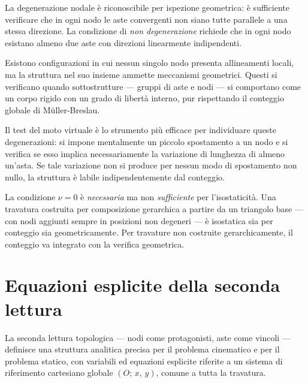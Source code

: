 La degenerazione nodale è riconoscibile per ispezione
geometrica: è sufficiente verificare che in ogni
nodo le aste convergenti non siano tutte parallele
a una stessa direzione. La condizione di
\emph{non degenerazione} richiede che in ogni nodo
esistano almeno due aste con direzioni linearmente
indipendenti.

Esistono configurazioni in cui nessun singolo nodo
presenta allineamenti locali, ma la struttura nel
suo insieme ammette meccanismi geometrici. Questi
si verificano quando sottostrutture --- gruppi di
aste e nodi --- si comportano come un corpo rigido
con un grado di libertà interno, pur rispettando
il conteggio globale di M\"{u}ller-Breslau.

Il test del moto virtuale è lo strumento più
efficace per individuare queste degenerazioni:
si impone mentalmente un piccolo spostamento a
un nodo e si verifica se esso implica
necessariamente la variazione di lunghezza di
almeno un'asta. Se tale variazione non si produce
per nessun modo di spostamento non nullo,
la struttura è labile indipendentemente dal
conteggio.

\begin{oss}
	La condizione $\nu = 0$ è \emph{necessaria}
	ma non \emph{sufficiente} per l'isostaticità.
	Una travatura costruita per composizione
	gerarchica a partire da un triangolo base ---
	con nodi aggiunti sempre in posizioni non
	degeneri --- è isostatica sia per conteggio
	sia geometricamente. Per travature non costruite
	gerarchicamente, il conteggio va integrato con
	la verifica geometrica.
\end{oss}


\section{Equazioni esplicite della seconda lettura}
\label{sec:equazioni_seconda_lettura}



La seconda lettura topologica --- nodi come protagonisti,
aste come vincoli --- definisce una struttura analitica
precisa per il problema cinematico e per il problema
statico, con variabili ed equazioni esplicite riferite
a un sistema di riferimento cartesiano globale
$(O;\, x,\, y)$, comune a tutta la travatura.

